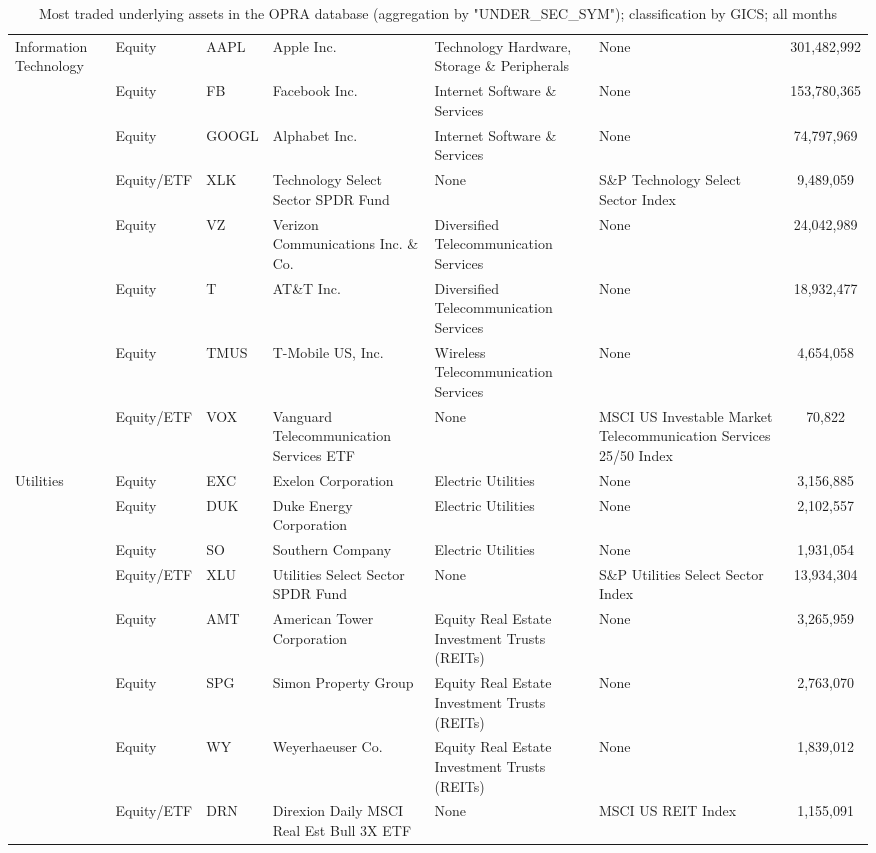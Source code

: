 \documentclass[a4paper,12pt]{article}
\theoremstyle{plain}
\theoremstyle{definition}
\begin{document}
\begin{landscape}
\begin{table}[ht!]
{\begin{tabular}{l l l l l p{5cm} c}
\hline 
 \multirow{5}{4cm}{Information Technology} & Equity & AAPL & Apple Inc. & Technology Hardware, Storage \& Peripherals  & None  & 301,482,992  \\ 
                  & Equity         & FB     & Facebook Inc.           &  Internet Software \& Services & None & 153,780,365  \\  
                  & Equity         & GOOGL    &  Alphabet Inc.    &    Internet Software \& Services  & None   & 74,797,969    \\
                  & Equity/ETF & XLK  & Technology Select Sector SPDR Fund & None & S\&P Technology Select Sector Index& 9,489,059  \\ 
\hline
 \multirow{5}{4cm}{Telecommunication Services} & Equity & VZ & Verizon Communications Inc. \& Co. & Diversified Telecommunication Services  & None & 24,042,989  \\ 
                  & Equity         & T     & AT\&T Inc.           &  Diversified Telecommunication Services & None & 18,932,477  \\  
                  & Equity         &  TMUS  & T-Mobile US, Inc.     &   Wireless Telecommunication Services   & None  & 4,654,058     \\
                  & Equity/ETF & VOX  & Vanguard Telecommunication Services ETF & None & MSCI US Investable Market Telecommunication Services 25/50 Index & 70,822  \\ 
\hline
 \multirow{5}{*}{Utilities} & Equity & EXC & Exelon Corporation & Electric Utilities  & None  & 3,156,885  \\ 
                  & Equity         & DUK     & Duke Energy Corporation     &  Electric Utilities & None & 2,102,557  \\  
                  & Equity         & SO   &  Southern Company    &   Electric Utilities   & None   &  1,931,054   \\
                  & Equity/ETF & XLU  & Utilities Select Sector SPDR Fund & None & S\&P Utilities Select Sector Index & 13,934,304  \\ 
\hline
 \multirow{5}{*}{Real Estate} & Equity        & AMT & American Tower Corporation & Equity Real Estate Investment Trusts (REITs)  & None  & 3,265,959  \\ 
                    & Equity & SPG     & Simon Property Group &  Equity Real Estate Investment Trusts (REITs) & None & 2,763,070  \\ 
                    & Equity         & WY   &  Weyerhaeuser Co.    &    Equity Real Estate Investment Trusts (REITs) & None  & 1,839,012    \\ 
                    & Equity/ETF & DRN  & Direxion Daily MSCI Real Est Bull 3X ETF & None & MSCI US REIT Index & 1,155,091  \\ 								
\hline \hline
\end{tabular}
}
\caption{\footnotesize Most traded underlying assets in the OPRA database (aggregation by "UNDER_SEC_SYM"); classification by GICS; all months}
\label{sumstat}
\end{table} 



\end{landscape}
\end{document}
